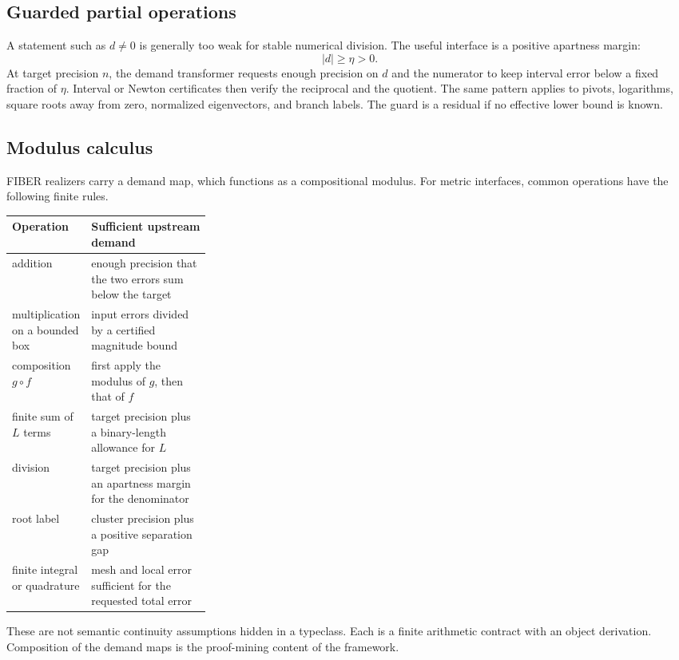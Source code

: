 \subsection{Guarded partial operations}

A statement such as \(d\ne0\) is generally too weak for stable numerical
division.  The useful interface is a positive apartness margin:
\[
             |d|\ge\eta>0.
\]
At target precision \(n\), the demand transformer requests enough precision on
\(d\) and the numerator to keep interval error below a fixed fraction of
\(\eta\).  Interval or Newton certificates then verify the reciprocal and the
quotient.  The same pattern applies to pivots, logarithms, square roots away
from zero, normalized eigenvectors, and branch labels.  The guard is a
residual if no effective lower bound is known.

\subsection{Modulus calculus}

FIBER realizers carry a demand map, which functions as a compositional modulus.
For metric interfaces, common operations have the following finite rules.

\begin{center}
\begin{tabularx}{0.96\linewidth}{Y{0.29\linewidth}X}
\toprule
Operation & Sufficient upstream demand\\
\midrule
addition & enough precision that the two errors sum below the target\\
multiplication on a bounded box & input errors divided by a certified magnitude bound\\
composition \(g\circ f\) & first apply the modulus of \(g\), then that of \(f\)\\
finite sum of \(L\) terms & target precision plus a binary-length allowance for \(L\)\\
division & target precision plus an apartness margin for the denominator\\
root label & cluster precision plus a positive separation gap\\
finite integral or quadrature & mesh and local error sufficient for the requested total error\\
\bottomrule
\end{tabularx}
\end{center}

These are not semantic continuity assumptions hidden in a typeclass.  Each is
a finite arithmetic contract with an object derivation.  Composition of the
demand maps is the proof-mining content of the framework.

